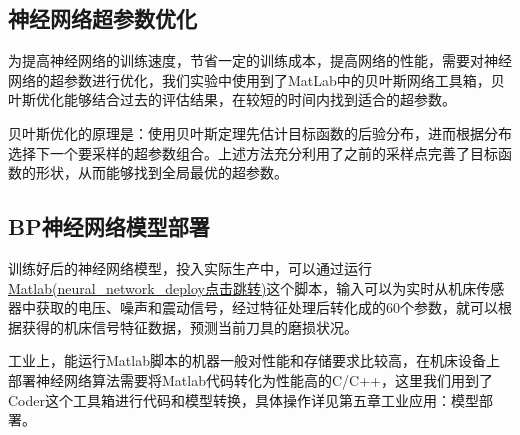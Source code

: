 \subsection{神经网络超参数优化}
为提高神经网络的训练速度，节省一定的训练成本，提高网络的性能，需要对神经网络的超参数进行优化，我们实验中使用到了MatLab中的贝叶斯网络工具箱，贝叶斯优化能够结合过去的评估结果，在较短的时间内找到适合的超参数。\par
贝叶斯优化的原理是：使用贝叶斯定理先估计目标函数的后验分布，进而根据分布选择下一个要采样的超参数组合。上述方法充分利用了之前的采样点完善了目标函数的形状，从而能够找到全局最优的超参数。\par
% 
\subsection{BP神经网络模型部署}
训练好后的神经网络模型，投入实际生产中，可以通过运行\href{https://github.com/QianZeHao123/OpenIE/blob/main/nc_machining_center/neural_network_deploy.m}{Matlab(neural\_network\_deploy点击跳转)}这个脚本，输入可以为实时从机床传感器中获取的电压、噪声和震动信号，经过特征处理后转化成的60个参数，就可以根据获得的机床信号特征数据，预测当前刀具的磨损状况。\par
工业上，能运行Matlab脚本的机器一般对性能和存储要求比较高，在机床设备上部署神经网络算法需要将Matlab代码转化为性能高的C/C++，这里我们用到了Coder这个工具箱进行代码和模型转换，具体操作详见第五章工业应用：模型部署。\par
% 
% 
